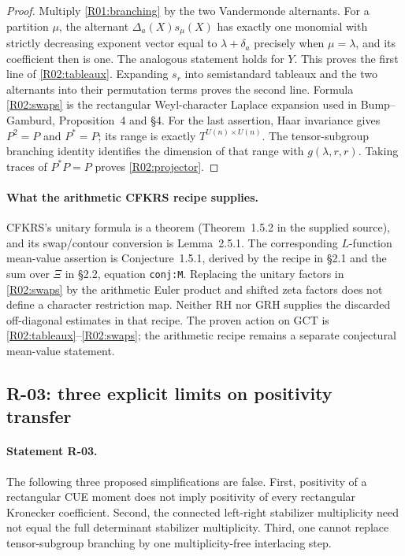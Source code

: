 \begin{proof}
Multiply \eqref{R01:branching} by the two Vandermonde alternants.
For a partition $\mu$, the alternant $\Delta_a(X)s_\mu(X)$ has exactly one
monomial with strictly decreasing exponent vector equal to
$\lambda+\delta_a$ precisely when $\mu=\lambda$, and its coefficient then
is one. The analogous statement holds for $Y$. This proves the first line
of \eqref{R02:tableaux}. Expanding $s_r$ into semistandard tableaux and
the two alternants into their permutation terms proves the second line.
Formula \eqref{R02:swaps} is the rectangular Weyl-character Laplace expansion
used in Bump--Gamburd, Proposition~4 and \S4. For the last assertion,
Haar invariance gives $P^2=P$ and $P^*=P$; its range is exactly $T^{U(n)\times
U(n)}$. The tensor-subgroup branching identity identifies the dimension of
that range with $g(\lambda,r,r)$. Taking traces of $P^*P=P$ proves
\eqref{R02:projector}.
\end{proof}

\paragraph{What the arithmetic CFKRS recipe supplies.}
CFKRS's unitary formula is a theorem (Theorem~1.5.2 in the supplied source),
and its swap/contour conversion is Lemma~2.5.1. The corresponding
$L$-function mean-value assertion is Conjecture~1.5.1, derived by the
recipe in \S2.1 and the sum over $\Xi$ in \S2.2, equation
\texttt{conj:M}. Replacing the unitary factors in \eqref{R02:swaps} by the
arithmetic Euler product and shifted zeta factors does not define a
character restriction map. Neither RH nor GRH supplies the discarded
off-diagonal estimates in that recipe. The proven action on GCT is
\eqref{R02:tableaux}--\eqref{R02:swaps}; the arithmetic recipe remains a
separate conjectural mean-value statement.

\subsection{R-03: three explicit limits on positivity transfer}

\paragraph{Statement R-03.}
The following three proposed simplifications are false.
First, positivity of a rectangular CUE moment does not imply positivity
of every rectangular Kronecker coefficient. Second, the connected
left-right stabilizer multiplicity need not equal the full determinant
stabilizer multiplicity. Third, one cannot replace tensor-subgroup
branching by one multiplicity-free interlacing step.

